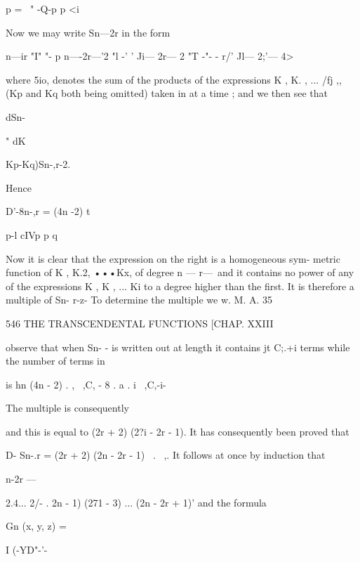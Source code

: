 {{p = \ " -Q-p p <i 

Now we may write Sn—2r in the form 

 n—ir "I"  "- p   n—-2r—'2 "l -' ' Ji— 2r— 2 "T -"- - r/' Jl— 2;'— 4> 

where 5io,  denotes the sum of the products of the expressions K , K. , ... /fj ,, 
(Kp and Kq both being omitted) taken in at a time ; and we then see that 






dSn- 

" dK 



 Kp-Kq)Sn-,r-2. 



Hence 



D'-8n-,r = (4n -2) t 






p-l cIVp p q 



Now it is clear that the expression on the right is a homogeneous sym- 
metric function of K , K.2, •••Kx,  of degree  n — r—\, and it contains no 
power of any of the expressions K , K , ... Ki  to a degree higher than the 
first. It is therefore a multiple of Sn- r-z- To determine the multiple we 
w. M. A. 35 



546 THE TRANSCENDENTAL FUNCTIONS [CHAP. XXIII 

observe that when Sn- -  is written out at length it contains jt C;.+i terms 
while the number of terms in 

is hn (4n - 2) .  , \ ,C, - 8 .   a . i \ ,C,-i- 

The multiple is consequently 

and this is equal to (2r + 2) (2?i - 2r - 1). 
It has consequently been proved that 

D- Sn-.r = (2r + 2) (2n - 2r - 1)   \ . \ ,. 
It follows at once by induction that 



 n-2r — 



2.4... 2/- .  2n - 1) (271 - 3) ... (2n - 2r + 1)' 
and the formula 



Gn (x, y, z) = 



I (-YD"-'- 



}}
